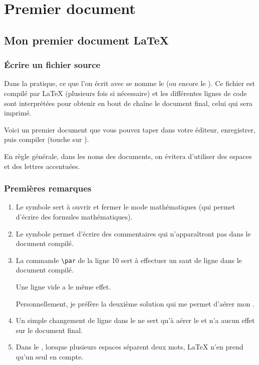 \chapter{Premier document}

\section{Mon premier document \LaTeX{}}
\subsection{\'Ecrire un fichier source}

Dans la pratique, ce que l'on écrit avec  se nomme le  (ou encore le ). Ce fichier est compilé par \LaTeX{} (plusieurs fois si nécessaire) et les différentes lignes de code sont interprétées pour obtenir en bout de chaîne le document final, celui qui sera imprimé.\medskip

Voici un premier document que vous pouvez taper dans votre éditeur, enregistrer, puis compiler (touche  sur ).


\begin{info}
En règle générale, dans les noms des documents, on évitera d'utiliser des espaces et des lettres accentuées.
\end{info}


\subsection{Premières remarques}

\begin{enumerate}
    \item Le symbole \ordi{\$} sert à ouvrir et fermer le mode mathématiques (qui permet d'écrire des formules mathématiques).
    \item Le symbole \ordi{\%} permet d'écrire des commentaires qui n'apparaîtront pas dans le document compilé.
    \item La commande \verb!\par! de la ligne 10 sert à effectuer un saut de ligne dans le document compilé.
    
    Une ligne vide a le même effet.
    
    Personnellement, je préfère la deuxième solution qui me permet d'aérer mon .
    
    \item Un simple changement de ligne dans le  ne sert qu'à aérer le  et n'a aucun effet sur le document final.
    \item Dans le , lorsque plusieurs espaces séparent deux mots, \LaTeX{} n'en prend qu'un seul en compte.
\end{enumerate}

